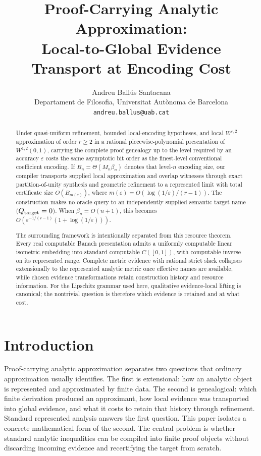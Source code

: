 \documentclass[11pt]{article}
\title{\textbf{Proof-Carrying Analytic Approximation:}\\\textbf{Local-to-Global Evidence Transport at Encoding Cost}}
\author{Andreu Ball\'us Santacana\\
\small Departament de Filosofia, Universitat Aut\`onoma de Barcelona\\
\small \texttt{andreu.ballus@uab.cat}}
\date{}
\theoremstyle{definition}
\begin{document}
\maketitle

\begin{abstract}
Under quasi-uniform refinement, bounded local-encoding hypotheses, and local
$W^{r,2}$ approximation of order $r\ge2$ in a rational piecewise-polynomial presentation
of $W^{1,2}(0,1)$, carrying the complete proof genealogy up to the level required by an
accuracy $\varepsilon$ costs the same asymptotic bit order as the finest-level conventional
coefficient encoding.  If $B_n=\Theta(M_n\beta_n)$ denotes that level-$n$ encoding size,
our compiler transports supplied local approximation and overlap witnesses through exact
partition-of-unity synthesis and geometric refinement to a represented limit with total
certificate size $O(B_{m(\varepsilon)})$, where
$m(\varepsilon)=O(\log(1/\varepsilon)/(r-1))$.  The construction makes no oracle query to
an independently supplied semantic target name ($Q_{\rm target}=0$).  When
$\beta_n=O(n+1)$, this becomes
$O(\varepsilon^{-1/(r-1)}(1+\log(1/\varepsilon)))$.

The surrounding framework is intentionally separated from this resource theorem.  Every
real computable Banach presentation admits a uniformly computable linear isometric
embedding into standard computable $C([0,1])$, with computable inverse on its represented
range.  Complete metric evidence with rational strict slack collapses extensionally to the represented
analytic metric once effective names are available, while chosen evidence transformations
retain construction history and resource information.  For the Lipschitz grammar used
here, qualitative evidence-local lifting is canonical; the nontrivial question is therefore
which evidence is retained and at what cost.
\end{abstract}

\section{Introduction}\label{sec:intro}

Proof-carrying analytic approximation separates two questions that ordinary approximation
usually identifies.  The first is extensional: how an analytic object is represented and
approximated by finite data.  The second is genealogical: which finite derivation produced
an approximant, how local evidence was transported into global evidence, and what it costs
to retain that history through refinement.  Standard represented analysis answers the
first question.  This paper isolates a concrete mathematical form of the second.  The
central problem is whether standard analytic inequalities can be compiled into finite proof
objects without discarding incoming evidence and recertifying the target from scratch.
\end{document}
